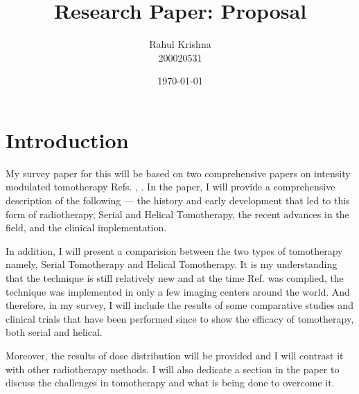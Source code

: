 \documentclass[12pt]{article}
\title{Research Paper: Proposal}
\author{Rahul Krishna \\ 200020531}
\date{\today}
\begin{document}
\maketitle
\section* {Introduction}
My survey paper for this will be based on two comprehensive papers on intensity modulated tomotherapy Refs. \cite{IMRT2001}, \cite{Mackie2006}. In the paper, I will provide a comprehensive description of the following --- the history and early development that led to this form of radiotherapy, Serial and Helical Tomotherapy, the recent advances in the field, and the clinical implementation. 

In addition, I will present a comparision between the two types of tomotherapy namely, Serial Tomotherapy and Helical Tomotherapy. It is my understanding that the technique is still relatively new and at the time Ref. \cite{IMRT2001} was complied, the technique was implemented in only a few imaging centers around the world. And therefore, in my survey, I will include the results of some comparative studies and clinical trials that have been performed since to show the efficacy of tomotherapy, both serial and helical.

Moreover, the results of dose distribution will be provided and I will  contrast it with other radiotherapy methods. I will also dedicate a section in the paper to discuss the challenges in tomotherapy and what is being done to overcome it.
{}

\end{document}
